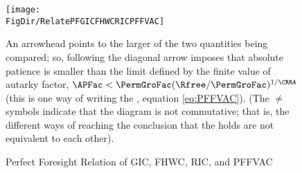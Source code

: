 \begin{figure}[ht]
  \centerline{
    \texttt{[image: \\FigDir/RelatePFGICFHWCRICPFFVAC]}
  }
  \caption{Perfect Foresight Relation of {GIC}, {FHWC}, {RIC}, and {PFFVAC}}
  \footnotesize{An arrowhead points to the larger of the two quantities being compared; so, following the diagonal arrow imposes that absolute patience is smaller than the limit defined by the finite value of autarky factor, $\APFac < \PermGroFac (\Rfree/\PermGroFac)^{1/\CRRA}$ (this is one way of writing the {\PFFVAC}, equation \eqref{eq:PFFVAC}}). (The $\neq$ symbols indicate that the diagram is not commutative; that is, the different ways of reaching the conclusion that the {\PFFVAC} holds are not equivalent to each other).
\end{figure}
